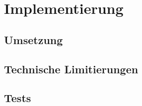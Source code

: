 \chapter{Implementierung}

\section{Umsetzung}

\section{Technische Limitierungen}

\section{Tests}
